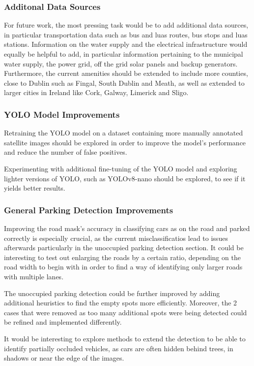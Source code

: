 \subsubsection{Additonal Data Sources}
For future work, the most pressing task would be to add additional data sources,
in particular transportation data such as bus and luas routes, bus stops and
luas stations. Information on the water supply and the electrical infrastructure
would equally be helpful to add, in particular information pertaining to the
municipal water supply, the power grid, off the grid solar panels and backup
generators. Furthermore, the current amenities should be extended to include
more counties, close to Dublin such as Fingal, South Dublin and Meath, as well
as extended to larger cities in Ireland like Cork, Galway, Limerick and Sligo.


\subsubsection{YOLO Model Improvements}
Retraining the YOLO model on a dataset containing more manually annotated
satellite images should be explored in order to improve the model's performance
and reduce the number of false positives.

Experimenting with additional fine-tuning of the YOLO model and exploring lighter 
versions of YOLO, such as YOLOv8-nano should be explored, to see if it yields better results.

\subsubsection{General Parking Detection Improvements}

Improving the road mask's accuracy in classifying cars as on the road and parked
correctly is especially crucial, as the current misclassificatios lead to
issues afterwards particularly in the unoccupied parking detection section. It could
be interesting to test out enlarging the roads by a certain ratio, depending on
the road width to begin with in order to find a way of identifying only larger
roads with multiple lanes.

The unoccupied parking detection could be further improved by adding additional
heuristics to find the empty spots more efficiently. Moreover, the 2 cases that
were removed as too many additional spots were being detected could be refined
and implemented differently.

\newpage{}

It would be interesting to explore methods to extend the detection to be able to
identify partially occluded vehicles, as cars are often hidden behind trees, in
shadows or near the edge of the images.
